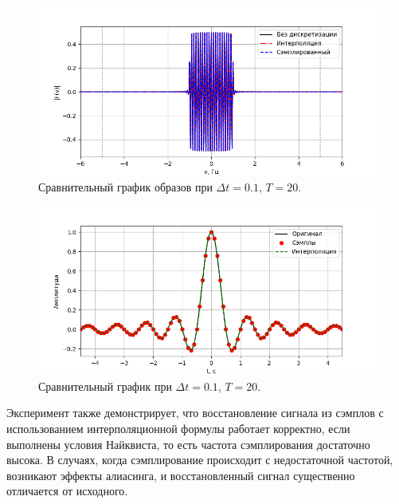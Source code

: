 \documentclass[a4paper]{article}
\begin{document}
\begin{figure}[H]
  \centering
  \includegraphics[width=\textwidth]{src/task_2/2_freq_20_0.1.png}
  \caption{Сравнительный график образов при $\Delta t=0.1$, $T=20$.} 
\end{figure}
\begin{figure}[H]
  \centering
  \includegraphics[width=\textwidth]{src/task_2/2_time_20_0.1.png}
  \caption{Сравнительный график при $\Delta t=0.1$, $T=20$.} 
\end{figure}

Эксперимент также демонстрирует, что восстановление сигнала из сэмплов с использованием интерполяционной формулы работает корректно, если выполнены условия Найквиста, то есть частота сэмплирования достаточно высока. В случаях, когда сэмплирование происходит с недостаточной частотой, возникают эффекты алиасинга, и восстановленный сигнал существенно отличается от исходного.
\end{document}
